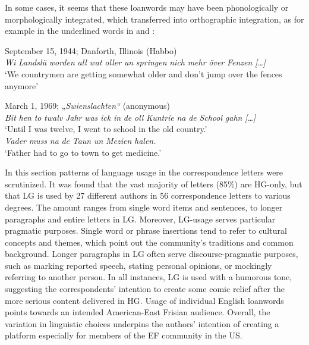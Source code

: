 \documentclass[output=paper]{langsci/langscibook}
\begin{document}
In some cases, it seems that these loanwords may have been phonologically or morphologically integrated, which transferred into orthographic integration, as for example in the underlined words in  and :

  
 \ea
\label{ex:rocker:15}
September 15, 1944; Danforth, Illinois (Habbo)\\
  
\textit{Wi} \textit{Landslü} \textit{worden} \textit{all} \textit{wat} \textit{oller} \textit{un} \textit{springen} \textit{nich} \textit{mehr} \textit{över} \textit{Fenzen} \textit{[…]}\\

‘We countrymen are getting somewhat older and don’t jump over the fences anymore’
\z

  
 \ea
\label{ex:rocker:16}
March 1, 1969; „\textit{Swienslachten“} (anonymous)\\

	\ea \textit{Bit} \textit{hen} \textit{to} \textit{twalv} \textit{Jahr} \textit{was} \textit{ick} \textit{in} \textit{de} \textit{oll} \textit{Kuntrie} \textit{na} \textit{de} \textit{School} \textit{gahn} \textit{[…]}\\
  
	{‘}Until I was twelve, I went to school in the old country.’\\  
 
	\ex \textit{Vader} \textit{muss} \textit{na} \textit{de} \textit{Taun} \textit{un} \textit{Mezien} \textit{halen.}\\
 
  ‘Father had to go to town to get medicine.’
 \z
 \z

 
In this section patterns of language usage in the correspondence letters were scrutinized. It was found that the vast majority of letters (85\%) are HG-only, but that LG is used by 27 different authors in 56 correspondence letters to various degrees. The amount ranges from single word items and sentences, to longer paragraphs and entire letters in LG. Moreover, LG-usage serves particular pragmatic purposes. Single word or phrase insertions tend to refer to cultural concepts and themes, which point out the community’s traditions and common background. Longer paragraphs in LG often serve discourse-pragmatic purposes, such as marking reported speech, stating personal opinions, or mockingly referring to another person. In all instances, LG is used with a humorous tone, suggesting the correspondents’ intention to create some comic relief after the more serious content delivered in HG. Usage of individual English loanwords points towards an intended American-East Frisian audience. Overall, the variation in linguistic choices underpins the authors’ intention of creating a platform especially for members of the EF community in the US. 
 
\end{document}

